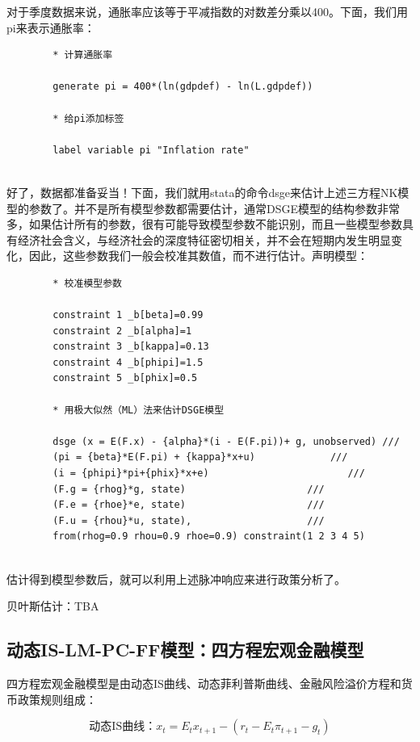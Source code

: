 \documentclass[cn,12pt,math=newtx,citestyle=gb7714-2015,bibstyle=gb7714-2015]{elegantbook}
\begin{document}
	对于季度数据来说，通胀率应该等于平减指数的对数差分乘以400。下面，我们用pi来表示通胀率：
	
	\begin{lstlisting}
		* 计算通胀率
		
		generate pi = 400*(ln(gdpdef) - ln(L.gdpdef))
		
		* 给pi添加标签
		
		label variable pi "Inflation rate"
		
	\end{lstlisting}
	
	好了，数据都准备妥当！下面，我们就用stata的命令dsge来估计上述三方程NK模型的参数了。并不是所有模型参数都需要估计，通常DSGE模型的结构参数非常多，如果估计所有的参数，很有可能导致模型参数不能识别，而且一些模型参数具有经济社会含义，与经济社会的深度特征密切相关，并不会在短期内发生明显变化，因此，这些参数我们一般会校准其数值，而不进行估计。声明模型：
	
	\begin{lstlisting}
		* 校准模型参数
		
		constraint 1 _b[beta]=0.99
		constraint 2 _b[alpha]=1
		constraint 3 _b[kappa]=0.13
		constraint 4 _b[phipi]=1.5
		constraint 5 _b[phix]=0.5
		
		* 用极大似然（ML）法来估计DSGE模型
		
		dsge (x = E(F.x) - {alpha}*(i - E(F.pi))+ g, unobserved) ///
		(pi = {beta}*E(F.pi) + {kappa}*x+u)             ///
		(i = {phipi}*pi+{phix}*x+e)                        ///
		(F.g = {rhog}*g, state)                     ///
		(F.e = {rhoe}*e, state)                     ///
		(F.u = {rhou}*u, state),                    ///
		from(rhog=0.9 rhou=0.9 rhoe=0.9) constraint(1 2 3 4 5)
		
	\end{lstlisting}
	
	估计得到模型参数后，就可以利用上述脉冲响应来进行政策分析了。
	
	贝叶斯估计：TBA
	
	
	
	
	\subsection{动态IS-LM-PC-FF模型：四方程宏观金融模型}
	
	四方程宏观金融模型是由动态IS曲线、动态菲利普斯曲线、金融风险溢价方程和货币政策规则组成：
	
		\begin{equation}
		\text{动态IS曲线：}x_t = E_t x_{t+1} - (r_t - E_t\pi_{t+1} - g_t)
	\end{equation}
	
\end{document}
